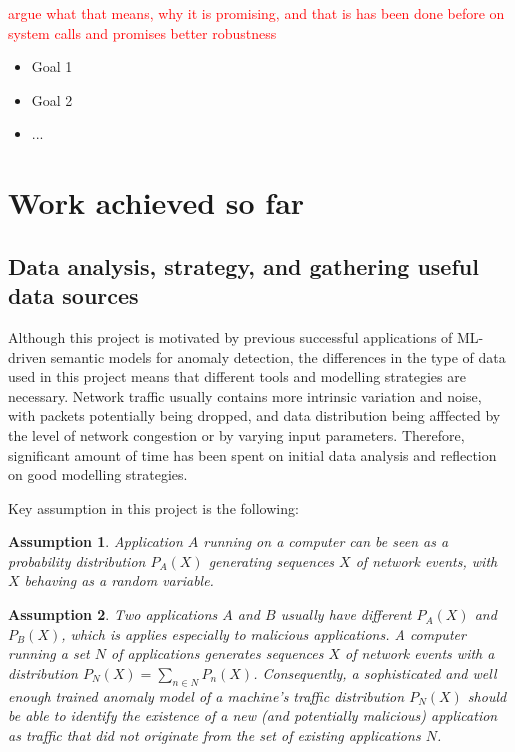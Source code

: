 \documentclass[a4paper,12pt,twoside]{report}
\newtheorem{assumption}{Assumption}
\begin{document}
 \textcolor{red}{argue what that means, why it is promising, and that is has been done before on system calls and promises better robustness}

\begin{itemize}
\item Goal 1
\item Goal 2
\item ...
\end{itemize}



\section{Work achieved so far}


\subsection{Data analysis, strategy, and gathering useful data sources}

Although this project is motivated by previous successful applications of ML-driven semantic models for anomaly detection, the differences in the type of data used in this project means that different tools and modelling strategies are necessary. Network traffic usually contains more intrinsic variation and noise, with packets potentially being dropped, and data distribution being afffected by the level of network congestion or by varying input parameters. Therefore, significant amount of time has been spent on initial data analysis and reflection on good modelling strategies. 

Key assumption in this project is the following:

\begin{assumption}\label{Ass1}
Application $A$ running on a computer can be seen as a probability distribution $P_A(X)$ generating sequences $X$ of network events, with $X$ behaving as a random variable.
\end{assumption}

\begin{assumption}\label{Ass2}
Two applications $A$ and $B$ usually have different $P_A(X)$ and $P_B(X)$, which is applies especially to malicious applications. A computer running a set $N$ of applications%
generates sequences $X$ of network events with a distribution $P_N(X)=\sum_{n\in N}P_n(X)$. Consequently, a sophisticated and well enough trained anomaly model of a machine's traffic distribution $P_N(X)$ should be able to identify the existence of a new (and potentially malicious) application as traffic that did not originate from the set of existing applications $N$.
\end{assumption}
\end{document}
